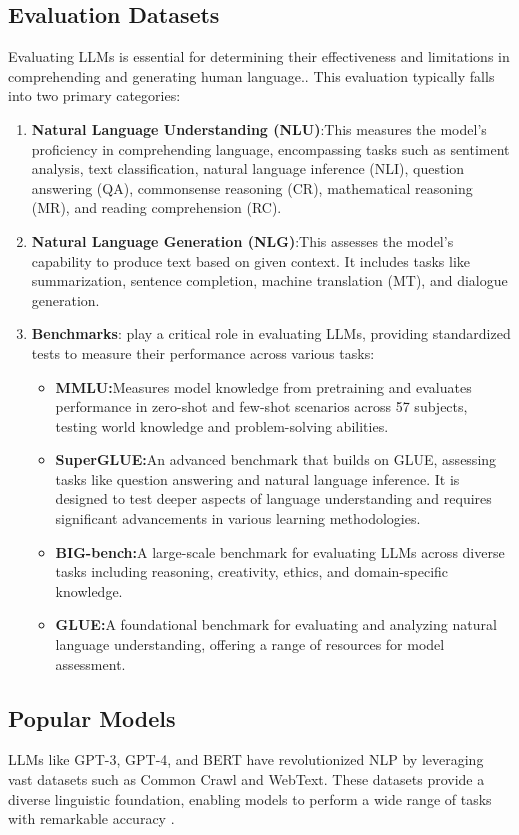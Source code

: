 \subsection{Evaluation Datasets}
Evaluating LLMs is essential for determining their effectiveness and limitations in comprehending and generating human language.\citep{Naveed2023}. This evaluation typically falls into two primary categories:
\begin{enumerate}
	
    \item  \textbf{Natural Language Understanding (NLU)}:This measures the model's proficiency in comprehending language, encompassing tasks such as sentiment analysis, text classification, natural language inference (NLI), question answering (QA), commonsense reasoning (CR), mathematical reasoning (MR), and reading comprehension (RC).
	\item 	\textbf{ Natural Language Generation (NLG)}:This assesses the model's capability to produce text based on given context. It includes tasks like summarization, sentence completion, machine translation (MT), and dialogue generation.
    \item \textbf{Benchmarks}: play a critical role in evaluating LLMs, providing standardized tests to measure their performance across various tasks:
    \begin{itemize}
    
   
	\item \textbf{MMLU:}Measures model knowledge from pretraining and evaluates performance in zero-shot and few-shot scenarios across 57 subjects, testing world knowledge and problem-solving abilities.
	\item \textbf{SuperGLUE:}An advanced benchmark that builds on GLUE, assessing tasks like question answering and natural language inference. It is designed to test deeper aspects of language understanding and requires significant advancements in various learning methodologies.
	\item \textbf{BIG-bench:}A large-scale benchmark for evaluating LLMs across diverse tasks including reasoning, creativity, ethics, and domain-specific knowledge.
	\item \textbf{GLUE:}A foundational benchmark for evaluating and analyzing natural language understanding, offering a range of resources for model assessment.
	 \end{itemize}
\end{enumerate}
\subsection{Popular Models}
LLMs like GPT-3, GPT-4, and BERT have revolutionized NLP by leveraging vast datasets such as Common Crawl and WebText. These datasets provide a diverse linguistic foundation, enabling models to perform a wide range of tasks with remarkable accuracy .

